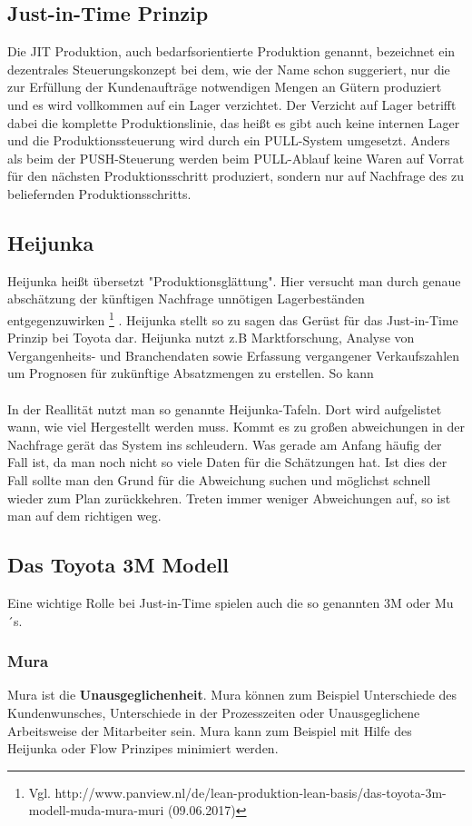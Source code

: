 \documentclass[00_ToyotaProduktionssystem.tex]{subfiles}
\begin{document}
\subsection{Just-in-Time Prinzip}
Die JIT Produktion, auch bedarfsorientierte Produktion genannt, bezeichnet ein dezentrales Steuerungskonzept bei dem,  wie der Name schon suggeriert, nur die zur Erfüllung der Kundenaufträge notwendigen Mengen an Gütern produziert und es wird vollkommen auf ein Lager verzichtet. Der Verzicht auf Lager betrifft dabei die komplette Produktionslinie, das heißt es gibt auch keine internen Lager und die Produktionssteuerung wird durch ein PULL-System umgesetzt. Anders als beim der PUSH-Steuerung werden beim PULL-Ablauf keine Waren auf Vorrat für den nächsten Produktionsschritt produziert, sondern nur auf Nachfrage des zu beliefernden Produktionsschritts.

\subsection{Heijunka}
Heijunka heißt übersetzt "Produktionsglättung". Hier versucht man durch genaue abschätzung der künftigen Nachfrage unnötigen Lagerbeständen entgegenzuwirken
\footnote{Vgl.  http://www.panview.nl/de/lean-produktion-lean-basis/das-toyota-3m-modell-muda-mura-muri (09.06.2017)}
. Heijunka stellt so zu sagen das Gerüst für das Just-in-Time Prinzip bei Toyota dar. Heijunka nutzt z.B Marktforschung, Analyse von Vergangenheits- und Branchendaten sowie Erfassung vergangener Verkaufszahlen um Prognosen für zukünftige Absatzmengen zu erstellen. So kann 
\\
\\
In der Reallität nutzt man so genannte Heijunka-Tafeln. Dort wird aufgelistet wann, wie viel Hergestellt werden muss. Kommt es zu großen abweichungen in der Nachfrage gerät das System ins schleudern. Was gerade am Anfang häufig der Fall ist, da man noch nicht so viele Daten für die Schätzungen hat. 
Ist dies der Fall sollte man den Grund für die Abweichung suchen und möglichst schnell wieder zum Plan zurückkehren. Treten immer weniger Abweichungen auf, so ist man auf dem richtigen weg.

\subsection{Das Toyota 3M Modell}
Eine wichtige Rolle bei Just-in-Time spielen auch die so genannten 3M oder Mu´s.
\subsubsection{Mura}
Mura ist die \textbf{Unausgeglichenheit}. Mura können zum Beispiel Unterschiede des Kundenwunsches, Unterschiede in der Prozesszeiten oder Unausgeglichene Arbeitsweise der Mitarbeiter sein. Mura kann zum Beispiel mit Hilfe des Heijunka oder Flow Prinzipes minimiert werden. \cite{panview}
\end{document}
